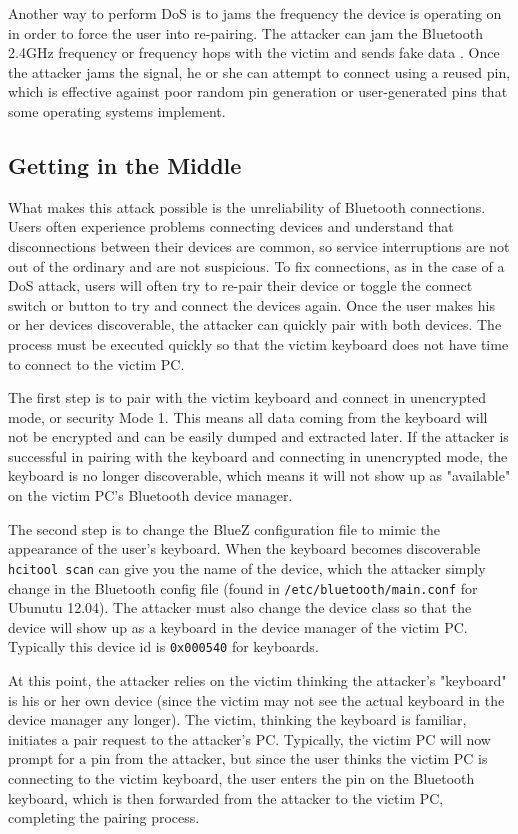 \documentclass{acm_proc_article-sp}
\begin{document}
Another way to perform DoS is to jams the frequency the device is operating on in order to force the user into re-pairing. The attacker can jam the Bluetooth 2.4GHz frequency or frequency hops with the victim and sends fake data \cite{4401672}. Once the attacker jams the signal, he or she can attempt to connect using a reused pin\cite{barnickel2012implementing}, which is effective against poor random pin generation or user-generated pins that some operating systems implement. 

\subsection{Getting in the Middle}
What makes this attack possible is the unreliability of Bluetooth connections. Users often experience problems connecting devices and understand that disconnections between their devices are common, so service interruptions are not out of the ordinary and are not suspicious. To fix connections, as in the case of a DoS attack, users will often try to re-pair their device or toggle the connect switch or button to try and connect the devices again. Once the user makes his or her devices discoverable, the attacker can quickly pair with both devices. The process must be executed quickly so that the victim keyboard does not have time to connect to the victim PC. 

The first step is to pair with the victim keyboard and connect in unencrypted mode, or security Mode 1. This means all data coming from the keyboard will not be encrypted and can be easily dumped and extracted later. If the attacker is successful in pairing with the keyboard and connecting in unencrypted mode, the keyboard is no longer discoverable, which means it will not show up as "available" on the victim PC's Bluetooth device manager. 

The second step is to change the BlueZ configuration file to mimic the appearance of the user's keyboard. When the keyboard becomes discoverable \texttt{hcitool scan} can give you the name of the device, which the attacker simply change in the Bluetooth config file (found in \texttt{/etc/bluetooth/main.conf} for Ubunutu 12.04). The attacker must also change the device class so that the device will show up as a keyboard in the device manager of the victim PC. Typically this device id is \texttt{0x000540} for keyboards. 

At this point, the attacker relies on the victim thinking the attacker's "keyboard" is his or her own device (since the victim may not see the actual keyboard in the device manager any longer). The victim, thinking the keyboard is familiar, initiates a pair request to the attacker's PC. Typically, the victim PC will now prompt for a pin from the attacker, but since the user thinks the victim PC is connecting to the victim keyboard, the user enters the pin on the Bluetooth keyboard, which is then forwarded from the attacker to the victim PC, completing the pairing process. 
\end{document}
